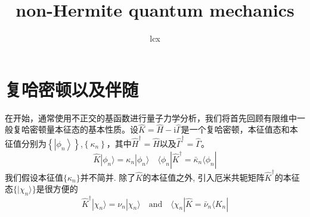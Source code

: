 \documentclass{article}
\begin{document}
\title{non-Hermite quantum mechanics}
\author{lcx}
\maketitle
\section{复哈密顿以及伴随}
在开始，通常使用不正交的基函数进行量子力学分析，我们将首先回顾有限维中一般复哈密顿量本征态的基本性质。设$\hat{K}=\hat{H}-\mathrm{i} \hat{\Gamma}$是一个复哈密顿，本征值态和本征值分别为$\left\{\left|\phi_{n}\right\rangle\right\} $,$\left\{\kappa_{n}\right\}$，其中$\hat{H}^{\dagger}=\hat{H}$以及$\hat{\Gamma}^{\dagger}=\hat{\Gamma}$。
\begin{equation}\label{1}
  \hat{K}|\phi_{n}\rangle=\kappa_{n}|\phi_{n}\rangle\quad \langle\phi_{n}|\hat{K}^{\dagger}=\bar{\kappa}_{n}\langle\phi_{n}|
\end{equation}
我们假设本征值$\{\kappa_n\}$并不简并. 除了$\hat{K}$的本征值之外, 引入厄米共轭矩阵$\hat{K}^\dag$的本征态$\{|\chi_n\rangle\}$是很方便的
\begin{equation}\label{2}
  \hat{K}^\dag|\chi_n\rangle=\nu_n|\chi_n\rangle\quad\text{and}\quad\langle\chi_n|\hat{K}=\bar{\nu}_n\langle K_n|
\end{equation}
\end{document}
